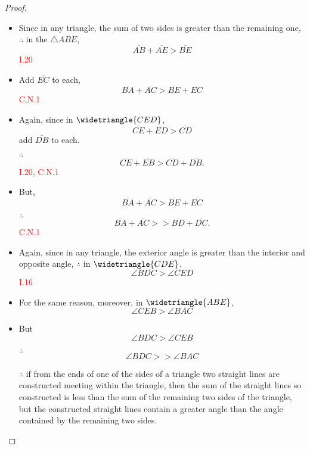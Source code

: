 \begin{proof}

\begin{itemize}

\item[]

\item Since in any triangle, the sum of two sides is greater than the remaining one, $\therefore$ in the  $\triangle{ABE}$, 
\[\overline{AB} + \overline{AE} > \overline{BE}\] \hfill\textcolor{red}{ I.20}

\item Add $\overline{EC}$ to each,
\[\overline{BA} + \overline{AC} > \overline{BE} + \overline{EC}\] \hfill\textcolor{red}{C.N.1}

\item Again, since in $\widetriangle{CED}$, 
\[\overline{CE} + \overline{ED} > \overline{CD}\] 
add $\overline{DB}$ to each. 

\item[$\therefore$] 
\[\overline{CE} + \overline{EB} > \overline{CD} + \overline{DB.}\] \hfill\textcolor{red}{I.20, C.N.1}

\item But,
\[\overline{BA} +  \overline{AC} > \overline{BE} + \overline{EC}\] 

\item[$\therefore$]
\[\overline{BA} + \overline{AC} >> \overline{BD} + \overline{DC}.\] \hfill\textcolor{red}{ C.N.1}

\clearpage

\item Again, since in any triangle, the exterior angle is greater than the interior and opposite angle, $\therefore$ in $\widetriangle{CDE}$, \[\angle{BDC} > \angle{CED}\] \hfill\textcolor{red}{I.16} 

\item For the same reason, moreover, in $\widetriangle{ABE}$, 
\[\angle{CEB} > \angle{BAC}\] 

\item But 
\[\angle{BDC} > \angle{CEB}\] 

\item[$\therefore$] 
\[\angle{BDC} >> \angle{BAC}\]

\item[$\therefore$] if from the ends of one of the sides of a triangle two straight lines are constructed meeting within the triangle, then the sum of the straight lines so constructed is less than the sum of the remaining two sides of the triangle, but the constructed straight lines contain a greater angle than the angle contained by the remaining two sides.

\end{itemize}

\end{proof}

\clearpage

